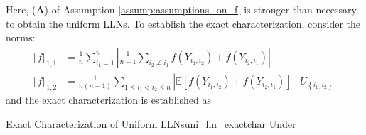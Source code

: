 \documentclass[twoside]{article}
\begin{document}
Here, (\textbf{A}) of Assumption \ref{assump:assumptions_on_f} is stronger than necessary to obtain the uniform LLNs. To establish the exact characterization, consider the norms:
\begin{align*}
    \left\Vert f \right\Vert _{1,1} &= \frac{1}{n} \sum^n_{i_1=1} \left\vert \frac{1}{n-1} \sum_{i_2 \neq i_1} f(Y_{i_1,i_2}) + f(Y_{i_2,i_1}) \right\vert \\
    \left\Vert f \right\Vert _{1,2} &= \frac{1}{n(n-1)} \sum_{1\leq i_1<i_2 \leq n} \left\vert \mathbb{E}\left[  f(Y_{i_1,i_2}) + f(Y_{i_2,i_1}) \right] \mid U_{\left\{ i_1,i_2 \right\}} \right\vert
\end{align*}
and the exact characterization is established as 
\begin{proposition}{Exact Characterization of Uniform LLNs}{uni_lln_exactchar}
    Under 
\end{proposition}

\newpage


\end{document}

